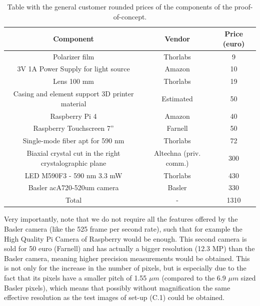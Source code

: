 \documentclass[11pt, a4paper, twoside]{article} %
\begin{document}
\begin{table}[h!]
\caption{Table with the general customer rounded prices of the components of the proof-of-concept. \vspace{-0.5cm}}
\center
{\small 
\centering
\label{tab:prices}
\begin{tabular}{c|c|c}
\toprule
    {\bf Component}& {\bf Vendor } & {\bf Price (euro) } \\
\hline
Polarizer film & Thorlabs & 9\\
3V 1A Power Supply for light source & Amazon & 10\\
Lens 100 mm & Thorlabs & 19\\
Casing and element support 3D printer material & Estimated & 50 \\
Raspberry Pi 4 & Amazon & 40\\
Raspberry Touchscreen 7'' & Farnell & 50\\
Single-mode fiber apt for 590 nm & Thorlabs & 72 \\
Biaxial crystal cut in the right crystalographic plane & Altechna (priv. comm.) & 300 \\
LED M590F3 - 590 nm 3.3 mW & Thorlabs & 430\\
Basler acA720-520um camera & Basler & 330\\
\hline
Total & - & 1310 \\
\bottomrule
\end{tabular}
}\vspace{-0.1cm}
\end{table}
\noindent Very importantly, note that we do not require all the features offered by the Basler camera (like the 525 frame per second rate), such that for example the High Quality Pi Camera of Raspberry would be enough. This second camera is sold for 50 euro (Farnell) and has actually a bigger resolution (12.3 MP) than the Basler camera, meaning higher precision measurements would be obtained. This is not only for the increase in the number of pixels, but is especially due to the fact that its pixels have a smaller pitch of 1.55 $\mu m$ (compared to the 6.9 $\mu m$ sized Basler pixels), which means that possibly without magnification the same effective resolution as the test images of set-up (C.1) could be obtained. \vspace{0.1cm}

\end{document}
